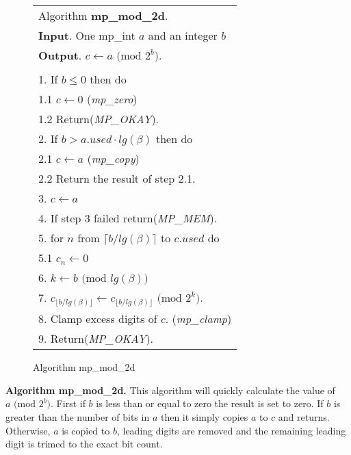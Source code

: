 \documentclass[b5paper]{book}
\begin{document}
\begin{figure}[!here]
\begin{small}
\begin{center}
\begin{tabular}{l}
\hline Algorithm \textbf{mp\_mod\_2d}. \\
\textbf{Input}.   One mp\_int $a$ and an integer $b$ \\
\textbf{Output}.  $c \leftarrow a \mbox{ (mod }2^b\mbox{)}$. \\
\hline \\
1.  If $b \le 0$ then do \\
\hspace{3mm}1.1  $c \leftarrow 0$ (\textit{mp\_zero}) \\
\hspace{3mm}1.2  Return(\textit{MP\_OKAY}). \\
2.  If $b > a.used \cdot lg(\beta)$ then do \\
\hspace{3mm}2.1  $c \leftarrow a$ (\textit{mp\_copy}) \\
\hspace{3mm}2.2  Return the result of step 2.1. \\
3.  $c \leftarrow a$ \\
4.  If step 3 failed return(\textit{MP\_MEM}). \\
5.  for $n$ from $\lceil b / lg(\beta) \rceil$ to $c.used$ do \\
\hspace{3mm}5.1  $c_n \leftarrow 0$ \\
6.  $k \leftarrow b \mbox{ (mod }lg(\beta)\mbox{)}$ \\
7.  $c_{\lfloor b / lg(\beta) \rfloor} \leftarrow c_{\lfloor b / lg(\beta) \rfloor} \mbox{ (mod }2^{k}\mbox{)}$. \\
8.  Clamp excess digits of $c$.  (\textit{mp\_clamp}) \\
9.  Return(\textit{MP\_OKAY}). \\
\hline
\end{tabular}
\end{center}
\end{small}
\caption{Algorithm mp\_mod\_2d}
\end{figure}

\textbf{Algorithm mp\_mod\_2d.}
This algorithm will quickly calculate the value of $a \mbox{ (mod }2^b\mbox{)}$.  First if $b$ is less than or equal to zero the 
result is set to zero.  If $b$ is greater than the number of bits in $a$ then it simply copies $a$ to $c$ and returns.  Otherwise, $a$ 
is copied to $b$, leading digits are removed and the remaining leading digit is trimed to the exact bit count.
\end{document}
